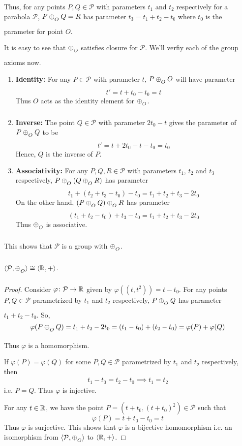 Thus, for any points $P,Q\in\mathcal{P}$ with parameters $t_1$ and $t_2$
respectively for a parabola $\mathcal{P}$, $P \conop Q = R$ has parameter
$t_3 = t_1 + t_2 - t_0$ where $t_0$ is the parameter for point $O$.
\vspace{1ex}

It is easy to see that $\conop$ satisfies closure for $\mathcal{P}$. We'll verfiy
each of the group axioms now.

\begin{enumerate}
    \item{\textbf{Identity:}} For any $P\in\mathcal{P}$ with parameter $t$,
        $P \conop O$ will have parameter
        \[ t' = t + t_0 - t_0 = t \]
        Thus $O$ acts as the identity element for $\conop$.

    \item{\textbf{Inverse:}} The point $Q\in\mathcal{P}$ with parameter $2t_0 - t$
        gives the parameter of $P \conop Q$ to be
        \[ t' = t + 2t_0 - t - t_0 = t_0 \]
        Hence, $Q$ is the inverse of $P$.

    \item{\textbf{Associativity:}} For any $P,Q,R \in \mathcal{P}$ with parameters
        $t_1$, $t_2$ and $t_3$ respectively, $P\conop(Q \conop R)$ has parameter
        \[ t_1 + (t_2 + t_3 - t_0) - t_0 = t_1 + t_2 + t_3 - 2t_0 \]
        On the other hand, $(P \conop Q)\conop R$ has parameter
        \[ (t_1 + t_2 - t_0) + t_3 - t_0 = t_1 + t_2 + t_3 - 2t_0 \]
        Thus $\conop$ is associative.
\end{enumerate}

\noindent
This shows that $\mathcal{P}$ is a group with $\conop$.

\begin{theorem}
    $\langle \mathcal{P},\conop \rangle \cong \langle \R,+ \rangle$.
\end{theorem}

\begin{proof}
    Consider $\varphi\colon\mathcal{P} \to \mathbb{R}$ given by
    $\varphi((t,t^2)) = t - t_0$. For any points
    $P,Q\in\mathcal{P}$ parametrized by $t_1$ and $t_2$ respectively,
    $P \conop Q$ has parameter $t_1 + t_2 - t_0$. So,
    \[
        \varphi(P \conop Q) = t_1 + t_2 - 2t_0 = (t_1 - t_0) + (t_2 - t_0)
        = \varphi(P) + \varphi(Q)
    \]
    Thus $\varphi$ is a homomorphism.
    \vspace{1ex}

    \noindent
    If $\varphi(P)=\varphi(Q)$ for some $P,Q\in\mathcal{P}$ parametrized by $t_1$
    and $t_2$ respectively, then
    \begin{align*}
        t_1 - t_0 = t_2 - t_0 \implies t_1 = t_2
    \end{align*}
    i.e. $P=Q$. Thus $\varphi$ is injective.
    \vspace{1ex}

    \noindent
    For any $t \in \mathbb{R}$, we have the point
    $P=(t + t_0,(t + t_0)^2) \in \mathcal{P}$ such that
    \[ \varphi(P) = t + t_0 - t_0 = t \]
    Thus $\varphi$ is surjective. This shows that $\varphi$ is a bijective
    homomorphism i.e. an isomorphism from $\langle \mathcal{P},\conop \rangle$ to
    $\langle \mathbb{R},+ \rangle$.
\end{proof}


